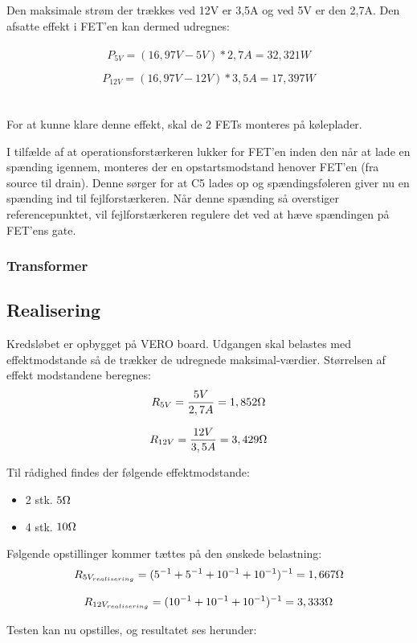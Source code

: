 Den maksimale strøm der trækkes ved 12V er 3,5A og ved 5V er den 2,7A. Den afsatte effekt i FET'en kan dermed udregnes:
\\\\
\begin{equation}
	P_{5V} = (16,97V - 5V) * 2,7A = 32,321W
\end{equation}

\begin{equation}
	P_{12V} = (16,97V - 12V) * 3,5A = 17,397W
\end{equation}
\\\\
For at kunne klare denne effekt, skal de 2 FETs monteres på køleplader.


I tilfælde af at operationsforstærkeren lukker for FET'en inden den når at lade en spænding igennem, monteres der en opstartsmodstand henover FET'en (fra source til drain).
Denne sørger for at C5 lades op og spændingsføleren giver nu en spænding ind til fejlforstærkeren. Når denne spænding så overstiger referencepunktet,
vil fejlforstærkeren regulere det ved at hæve spændingen på FET'ens gate.

\subsubsection{Transformer}


\subsection{Realisering}
Kredsløbet er opbygget på VERO board. Udgangen skal belastes med effektmodstande så de trækker de udregnede maksimal-værdier.
Størrelsen af effekt modstandene beregnes:
\begin{equation}
	R_{5V} = \frac{5V}{2,7A} = 1,852\ohm
\end{equation}

\begin{equation}
	R_{12V} = \frac{12V}{3,5A} = 3,429\ohm
\end{equation}

Til rådighed findes der følgende effektmodstande:
\begin{itemize}
\item 2 stk. $5\ohm$
\item 4 stk. $10\ohm$
\end{itemize}

Følgende opstillinger kommer tættes på den ønskede belastning:
\begin{equation}
	R_{5V_{realisering}} = (5^{-1} + 5^{-1} + 10^{-1} + 10^{-1})^{-1} = 1,667\ohm
\end{equation}

\begin{equation}
	R_{12V_{realisering}} = (10^{-1} + 10^{-1} + 10^{-1})^{-1} = 3,333\ohm
\end{equation}

Testen kan nu opstilles, og resultatet ses herunder:

